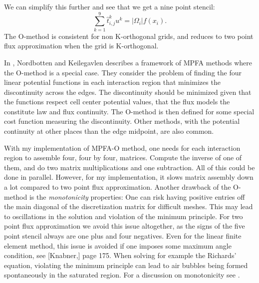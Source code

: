 \documentclass[../Main/main.tex]{subfiles}
\begin{document}
	We can simplify this further and see that we get a nine point stencil:
	\begin{equation*}
		\sum_{k=1}^9 \hat{t}^{k}_{i,j}u^k = |\Omega_i|f(x_i).
	\end{equation*}
	The O-method is consistent for non K-orthogonal grids, and reduces to two point flux approximation when the grid is K-orthogonal.
	\par
	In \cite{nordbotten2020introduction}, Nordbotten and Keilegavlen describes a framework of MPFA methods where the O-method is a special case. They consider the problem of finding the four linear potential functions in each interaction region that minimizes the discontinuity across the edges. The discontinuity should be minimized given that the functions respect cell center potential values, that the flux models the constitute law and flux continuity. The O-method is then defined for some special cost function measuring the discontinuity. Other methods, with the potential continuity at other places than the edge midpoint, are also common.
	\par 
	With my implementation of MPFA-O method, one needs for each interaction region to assemble four, four by four, matrices. Compute the inverse of one of them, and do two matrix multiplications and one subtraction. All of this could be done in parallel. However, for my implementation, it slows matrix assembly down a lot compared to two point flux approximation. Another drawback of the O-method is the \emph{monotonicity} properties: One can risk having positive entries off the main diagonal of the discretization matrix for difficult meshes. This may lead to oscillations in the solution and violation of the minimum principle. For two point flux approximation we avoid this issue altogether, as the signs of the five point stencil always are one plus and four negatives. Even for the linear finite element method, this issue is avoided if one imposes some maximum angle condition, see [Knabner,\cite{Knabner}] page 175. When solving for example the Richards' equation, violating the minimum principle can lead to air bubbles being formed spontaneously in the saturated region. For a discussion on monotonicity see \cite{10.1007/s00211-006-0060-z}.
\end{document}
